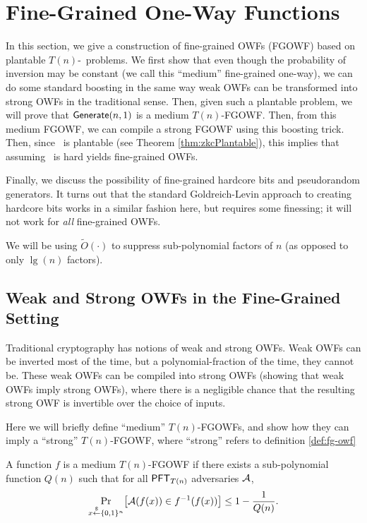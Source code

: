 \section{Fine-Grained One-Way Functions}\label{sec:fg-owfs}

In this section, we give a construction of fine-grained OWFs (FGOWF) based on plantable $T(n)$-\ACIH~problems. We first show that even though the probability of inversion may be constant (we call this ``medium'' fine-grained one-way), we can do some standard boosting in the same way weak OWFs can be transformed into strong OWFs in the traditional sense. Then, given such a plantable problem, we will prove that $\mathsf{Generate}(n,1)$ is a medium $T(n)$-FGOWF. Then, from this medium FGOWF, we can compile a strong FGOWF using this boosting trick. Then, since \zkclique~is plantable (see Theorem \ref{thm:zkcPlantable}), this implies that assuming \zkclique~is hard yields fine-grained OWFs.

Finally, we discuss the possibility of fine-grained hardcore bits and pseudorandom generators. It turns out that the standard Goldreich-Levin \cite{hardCoreBitsAndXorLemmaFromGL} approach to creating hardcore bits works in a similar fashion here, but requires some finessing; it will not work for \emph{all} fine-grained OWFs.

We will be using $\tilde{O}(\cdot)$ to suppress sub-polynomial factors of $n$ (as opposed to only $\lg(n)$ factors). 

\subsection{Weak and Strong OWFs in the Fine-Grained Setting}

Traditional cryptography has notions of weak and strong OWFs. Weak OWFs can be inverted most of the time, but a polynomial-fraction of the time, they cannot be. These weak OWFs can be compiled into strong OWFs (showing that weak OWFs imply strong OWFs), where there is a negligible chance that the resulting strong OWF is invertible over the choice of inputs.

Here we will briefly define ``medium'' $T(n)$-FGOWFs, and show how they can imply a ``strong'' $T(n)$-FGOWF, where ``strong'' refers to definition \ref{def:fg-owf}

\begin{definition}
	A function $f$ is a medium $T(n)$-FGOWF if there exists a sub-polynomial function $Q(n)$ such that for all $\mathsf{PFT}_{T(n)}$ adversaries $\mathcal{A}$,
	\[ \Pr_{x \stackrel{\scriptscriptstyle{\$}}{\gets} \{0,1\}^n}\bigl[ \mathcal{A}(f(x)) \in f^{-1}(f(x)) \bigr] \le 1 - \frac 1 {Q(n)}. \]
\end{definition}

